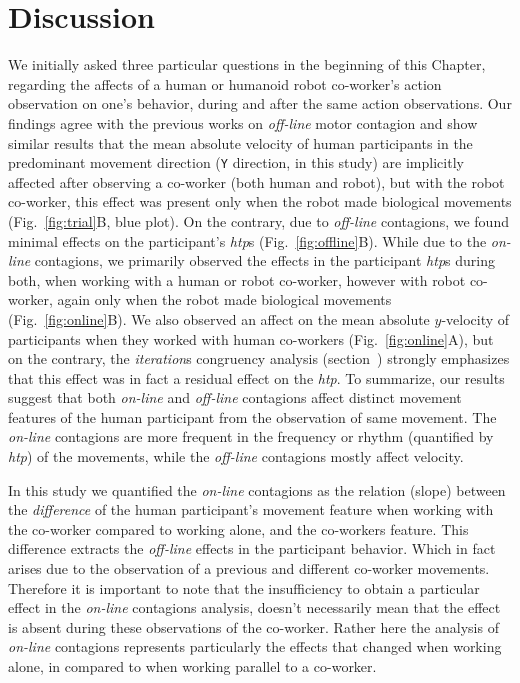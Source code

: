
\section{Discussion}

We initially asked three particular questions in the beginning of this Chapter, regarding the affects of a human or humanoid robot co-worker's action observation on one's behavior, during and after the same action observations. Our findings agree with the previous works on \textit{off-line} motor contagion and show similar results that the mean absolute velocity of human participants in the predominant movement direction (\texttt{Y} direction, in this study) are implicitly affected after observing a co-worker (both human and robot), but with the robot co-worker, this effect was present only when the robot made biological movements (Fig.~\ref{fig:trial}B, blue plot). On the contrary, due to \textit{off-line} contagions, we found minimal effects on the participant's {\it htp}s (Fig.~\ref{fig:offline}B). While due to the \textit{on-line} contagions, we primarily observed the effects in the participant {\it htp}s during both, when working with a human or robot co-worker, however with robot co-worker, again only when the robot made biological movements (Fig.~\ref{fig:online}B). We also observed an affect on the mean absolute $y$-velocity of participants when they worked with human co-workers (Fig.~\ref{fig:online}A), but on the contrary, the \textit{iteration}s congruency analysis (section~) strongly emphasizes that this effect was in fact a residual effect on the {\it htp}. To summarize, our results suggest that both \textit{on-line} and \textit{off-line} contagions affect distinct movement features of the human participant from the observation of same movement. The \textit{on-line} contagions are more frequent in the frequency or rhythm (quantified by {\it htp}) of the movements, while the \textit{off-line} contagions mostly affect velocity.

In this study we quantified the \textit{on-line} contagions as the relation (slope) between the \textit{difference} of the human participant's movement feature when working with the co-worker compared to working alone, and the co-workers feature. This difference extracts the \textit{off-line} effects in the participant behavior. Which in fact arises due to the observation of a previous and different co-worker movements. Therefore it is important to note that the insufficiency to obtain a particular effect in the \textit{on-line} contagions analysis, doesn't necessarily mean that the effect is absent during these observations of the co-worker. Rather here the analysis of \textit{on-line} contagions represents particularly the effects that changed when working alone, in compared to when working parallel to a co-worker.

